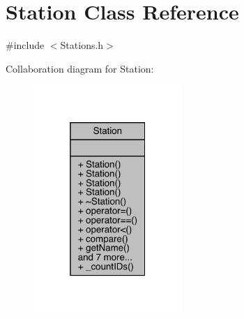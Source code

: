 \hypertarget{class_station}{}\section{Station Class Reference}
\label{class_station}


{\ttfamily \#include $<$Stations.\+h$>$}



Collaboration diagram for Station\+:
\nopagebreak
\begin{figure}[H]
\begin{center}
\leavevmode
\includegraphics[width=160pt]{class_station__coll__graph}
\end{center}
\end{figure}
